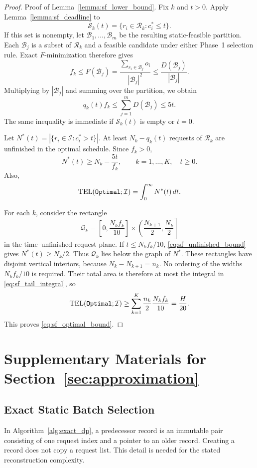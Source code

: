 \documentclass[nonblindrev]{informs3_hide}
\newcommand{\opt}{\texttt{Optimal}}
\begin{document}
\begin{proof}{Proof of Lemma~\ref{lemma:sf_lower_bound}.}
Fix $k$ and $t>0$. Apply Lemma~\ref{lemma:sf_deadline} to
\[
    \mathcal S_k(t)=\{r_i\in\mathcal R_k:c_i^*\le t\}.
\]
If this set is nonempty, let $\mathcal B_1,\ldots,\mathcal B_m$ be the
resulting static-feasible partition. Each $\mathcal B_j$ is a subset of
$\mathcal R_k$ and a feasible candidate under either Phase~1 selection
rule. Exact $F$-minimization therefore gives
\[
    f_k\le F(\mathcal B_j)
    =\frac{\sum_{r_i\in\mathcal B_j}o_i}{|\mathcal B_j|^2}
    \le\frac{D(\mathcal B_j)}{|\mathcal B_j|}.
\]
Multiplying by $|\mathcal B_j|$ and summing over the partition, we obtain
\[
    q_k(t)f_k
    \le\sum_{j=1}^mD(\mathcal B_j)\le5t.
\]
The same inequality is immediate if $\mathcal S_k(t)$ is empty or $t=0$.

Let $N^*(t)=|\{r_i\in\mathcal I:c_i^*>t\}|$. At least
$N_k-q_k(t)$ requests of $\mathcal R_k$ are unfinished in the optimal
schedule. Since $f_k>0$,
\begin{equation}
\label{eq:sf_unfinished_bound}
    N^*(t)\ge N_k-\frac{5t}{f_k},
    \qquad k=1,\ldots,K,\quad t\ge0.
\end{equation}
Also,
\begin{equation}
\label{eq:sf_tail_integral}
    \mathrm{TEL}(\textup{\opt};\mathcal I)
    =\int_0^\infty N^*(t)\,dt.
\end{equation}

For each $k$, consider the rectangle
\[
    \mathcal Q_k=
    \left[0,\frac{N_kf_k}{10}\right]
    \times\left(\frac{N_{k+1}}2,\frac{N_k}2\right]
\]
in the time--unfinished-request plane. If $t\le N_kf_k/10$,
\eqref{eq:sf_unfinished_bound} gives $N^*(t)\ge N_k/2$. Thus
$\mathcal Q_k$ lies below the graph of $N^*$. These rectangles have
disjoint vertical interiors, because $N_k-N_{k+1}=n_k$. No ordering of the widths $N_kf_k/10$ is required. Their total area
is therefore at most the integral in \eqref{eq:sf_tail_integral}, so
\[
    \mathrm{TEL}(\textup{\opt};\mathcal I)
    \ge\sum_{k=1}^K\frac{n_k}{2}\frac{N_kf_k}{10}
    =\frac{H}{20}.
\]
This proves \eqref{eq:sf_optimal_bound}.
\Halmos
\end{proof}


\section{Supplementary Materials for Section~\ref{sec:approximation}}
\label{append:approx}

\subsection{Exact Static Batch Selection}
In Algorithm~\ref{alg:exact_dp}, a predecessor record is an
immutable pair consisting of one request index and a pointer to an older
record. Creating a record does not copy a request list. This detail is
needed for the stated reconstruction complexity.
\end{document}
